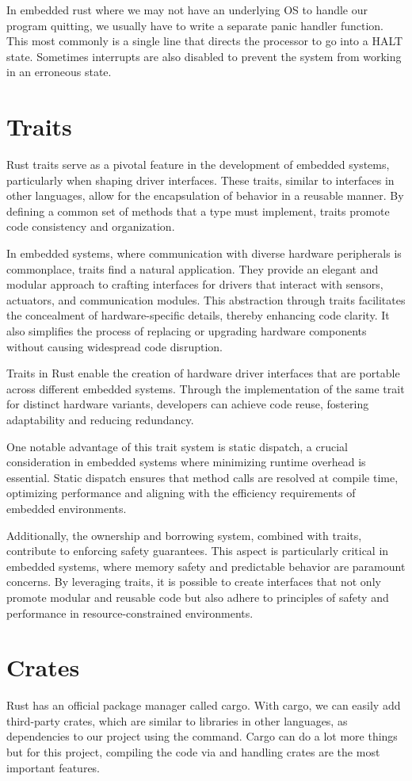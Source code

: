 In embedded rust where we may not have an underlying OS to handle our program quitting, we usually have to write a separate panic handler function. This most commonly is a single line that directs the processor to go into a HALT state. Sometimes interrupts are also disabled to prevent the system from working in an erroneous state.

\section{Traits}

Rust traits serve as a pivotal feature in the development of embedded systems, particularly when shaping driver interfaces. These traits, similar to interfaces in other languages, allow for the encapsulation of behavior in a reusable manner. By defining a common set of methods that a type must implement, traits promote code consistency and organization.

In embedded systems, where communication with diverse hardware peripherals is commonplace, traits find a natural application. They provide an elegant and modular approach to crafting interfaces for drivers that interact with sensors, actuators, and communication modules. This abstraction through traits facilitates the concealment of hardware-specific details, thereby enhancing code clarity. It also simplifies the process of replacing or upgrading hardware components without causing widespread code disruption.

Traits in Rust enable the creation of hardware driver interfaces that are portable across different embedded systems. Through the implementation of the same trait for distinct hardware variants, developers can achieve code reuse, fostering adaptability and reducing redundancy.

One notable advantage of this trait system is static dispatch, a crucial consideration in embedded systems where minimizing runtime overhead is essential. Static dispatch ensures that method calls are resolved at compile time, optimizing performance and aligning with the efficiency requirements of embedded environments.

Additionally, the ownership and borrowing system, combined with traits, contribute to enforcing safety guarantees. This aspect is particularly critical in embedded systems, where memory safety and predictable behavior are paramount concerns. By leveraging traits, it is possible to create interfaces that not only promote modular and reusable code but also adhere to principles of safety and performance in resource-constrained environments.

\section{Crates}

Rust has an official package manager called cargo. With cargo, we can easily add third-party crates, which are similar to libraries in other languages, as dependencies to our project using the  command. Cargo can do a lot more things but for this project, compiling the code via  and handling crates are the most important features.
